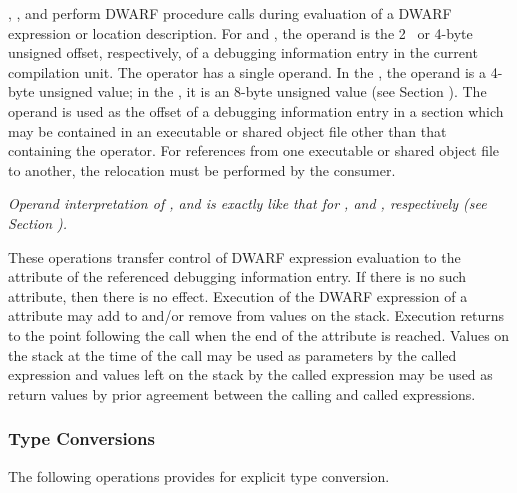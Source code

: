 \begin{enumerate}[1. ]
\itembfnl{\DWOPcalltwoTARG, \DWOPcallfourTARG, \DWOPcallrefTARG}
\DWOPcalltwoNAME, 
\DWOPcallfourNAME, 
and \DWOPcallrefNAME{} perform
DWARF procedure calls during evaluation of a DWARF expression or
location description. 
For \DWOPcalltwoNAME{} and \DWOPcallfourNAME{}, 
the operand is the 2\dash~ or 4-byte unsigned offset, respectively,
of a debugging information entry in the current compilation
unit. The \DWOPcallrefNAME{} operator has a single operand. In the
\thirtytwobitdwarfformat,
the operand is a 4-byte unsigned value;
in the \sixtyfourbitdwarfformat, it is an 8-byte unsigned value
(see Section ). 
The operand is used as the offset of a
debugging information entry in a 
\dotdebuginfo{}
section which may be contained in an executable or shared object file
other than that containing the operator. For references from
one executable or shared object file to another, the relocation
must be performed by the consumer.  

\textit{Operand interpretation of
\DWOPcalltwo, \DWOPcallfour{} and \DWOPcallref{} is exactly like
that for \DWFORMreftwo, \DWFORMreffour{} and \DWFORMrefaddr,
respectively  
(see Section  ).}

These operations transfer control of DWARF expression evaluation to 
the 
\DWATlocation{}
attribute of the referenced debugging information entry. If
there is no such attribute, then there is no effect. Execution
of the DWARF expression of 
a 
\DWATlocation{} attribute may add
to and/or remove from values on the stack. Execution returns
to the point following the call when the end of the attribute
is reached. Values on the stack at the time of the call may be
used as parameters by the called expression and values left on
the stack by the called expression may be used as return values
by prior agreement between the calling and called expressions.
\end{enumerate}

\subsubsection{Type Conversions}
\label{chap:typeconversions}
The following operations provides for explicit type conversion.


